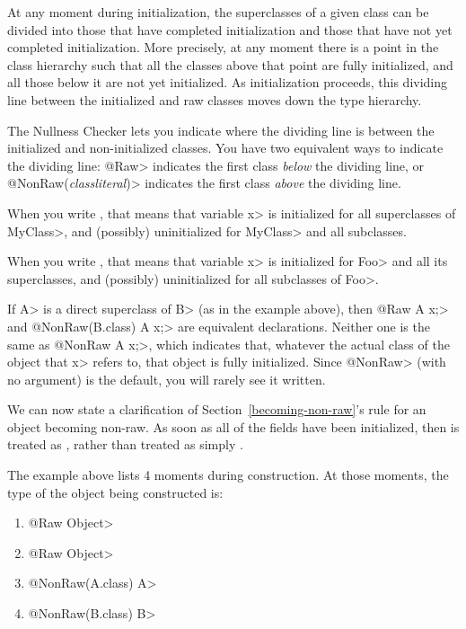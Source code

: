 At any moment during initialization, the superclasses of a given class
can be divided into those that have completed initialization and those that
have not yet completed initialization.  More precisely, at any moment there
is a point in the class hierarchy such that all the classes above that
point are fully initialized, and all those below it are not yet
initialized.  As initialization proceeds, this dividing line between the
initialized and raw classes moves down the type hierarchy.

The Nullness Checker lets you indicate where the dividing line is between
the initialized and non-initialized classes.
You have two equivalent ways to indicate the dividing line:  \<@Raw>
indicates the first class \emph{below} the dividing line, or
\<@NonRaw(\emph{classliteral})> indicates the first class \emph{above} the
dividing line.

When you write , that
means that variable \<x> is initialized for all superclasses of \<MyClass>,
and (possibly) uninitialized for \<MyClass> and all subclasses.

When you write , that means that variable \<x> is initialized for \<Foo> and all its
superclasses, and (possibly) uninitialized for all subclasses of \<Foo>.

If \<A> is a direct superclass of \<B> (as in the example above), then 
\<@Raw A x;> and \<@NonRaw(B.class) A x;> are equivalent declarations.
Neither one is the same as \<@NonRaw A x;>, which indicates that, whatever
the actual class of the object that \<x> refers to, that object is fully
initialized.  Since \<@NonRaw> (with no argument) is the default, you will
rarely see it written.

\label{becoming-non-raw-clarification}

We can now state a clarification of Section~\ref{becoming-non-raw}'s rule
for an object becoming non-raw.
As soon as all of the  fields
have been initialized, then  is treated as
, rather than
treated as simply 
.

The example above lists 4 moments during construction.  At those moments,
the type of the object being constructed is:

\begin{enumerate}
\item
  \<@Raw Object>
\item
  \<@Raw Object>
\item
  \<@NonRaw(A.class) A>
\item
  \<@NonRaw(B.class) B>
\end{enumerate}

